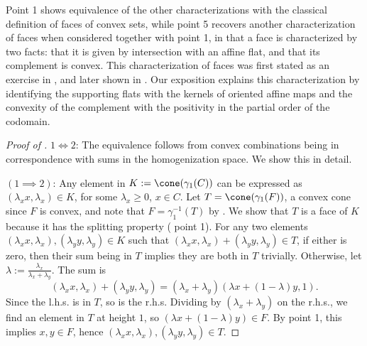 \documentclass{article}
\theoremstyle{plain}
\theoremstyle{definition}
\theoremstyle{remark}
\begin{document}
Point 1 shows equivalence of the other characterizations with the classical definition of faces of convex sets, while point 5 recovers another characterization of faces when considered together with  point 1, in that a face
is characterized by two facts: that it is given by intersection with an affine flat, and
that its complement is convex. This characterization of faces was first stated as an exercise in \cite{brondstedIntroductionConvexPolytopes1983}, and later shown in \cite{scottBilateralFacialReduction2026}. Our exposition explains this characterization by identifying the supporting flats with the kernels of oriented affine maps and the convexity of the complement with the positivity in the partial order of the codomain.
\begin{proof}[\hypertarget{loc:characterization_of_the_faces_of_convex_sets.proof}{}Proof of ]

$1 \iff 2$: The equivalence  follows from convex combinations being in correspondence with sums in the homogenization space. We show this in detail.

$(1 \implies 2)$:
Any element in $K := \cone(\gamma_1(C))$ can be expressed as $(\lambda_x x, \lambda_x) \in K$, for some $\lambda_x \geq 0$, $x \in C$. Let $T = \cone(\gamma_1(F))$, a convex cone since $F$ is convex, and note that $F = \gamma_1^{-1}(T)$ by . 
We show that $T$ is a face of $K$ because it has the splitting property ( point 1).
For any two elements $(\lambda_x x,  \lambda_x),  (\lambda_y y,  \lambda_y) \in K$
such that $(\lambda_x x,  \lambda_x) + (\lambda_y y,  \lambda_y) \in T$,
if either is zero, then their sum being in $T$ implies they are both in $T$ trivially. Otherwise,
let $\lambda := \frac{\lambda_x}{\lambda_x + \lambda_y}$. The sum is
\begin{equation*}
(\lambda_x x,  \lambda_x) + (\lambda_y y,  \lambda_y) = (\lambda_x + \lambda_y)(\lambda x + (1-\lambda) y, 1).
\end{equation*}
Since the l.h.s. is in $T$, so is the r.h.s. Dividing by $(\lambda_x + \lambda_y)$ on the r.h.s.,
we find an element in $T$ at height $1$, so $(\lambda x + (1-\lambda) y) \in F$. By point 1, this implies $x,y \in F$, hence $(\lambda_x x, \lambda_x), (\lambda_y y,\lambda_y) \in T$.


\end{proof}
\end{document}
